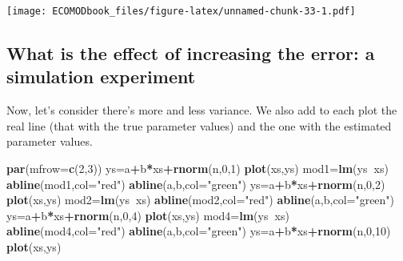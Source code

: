 \documentclass[
]{book}
\newenvironment{Shaded}{\begin{snugshade}}{\end{snugshade}}
\newcommand{\DataTypeTok}[1]{\textcolor[rgb]{0.13,0.29,0.53}{#1}}
\newcommand{\DecValTok}[1]{\textcolor[rgb]{0.00,0.00,0.81}{#1}}
\newcommand{\KeywordTok}[1]{\textcolor[rgb]{0.13,0.29,0.53}{\textbf{#1}}}
\newcommand{\NormalTok}[1]{#1}
\newcommand{\OperatorTok}[1]{\textcolor[rgb]{0.81,0.36,0.00}{\textbf{#1}}}
\newcommand{\StringTok}[1]{\textcolor[rgb]{0.31,0.60,0.02}{#1}}
\begin{document}
\texttt{[image: ECOMODbook\_files/figure-latex/unnamed-chunk-33-1.pdf]}

\hypertarget{what-is-the-effect-of-increasing-the-error-a-simulation-experiment}{%
\subsection{What is the effect of increasing the error: a simulation experiment}\label{what-is-the-effect-of-increasing-the-error-a-simulation-experiment}}

Now, let's consider there's more and less variance. We also add to each plot the real line (that with the true parameter values) and the one with the estimated parameter values.

\begin{Shaded}
\begin{Highlighting}[]
\KeywordTok{par}\NormalTok{(}\DataTypeTok{mfrow=}\KeywordTok{c}\NormalTok{(}\DecValTok{2}\NormalTok{,}\DecValTok{3}\NormalTok{))}
\NormalTok{ys=a}\OperatorTok{+}\NormalTok{b}\OperatorTok{*}\NormalTok{xs}\OperatorTok{+}\KeywordTok{rnorm}\NormalTok{(n,}\DecValTok{0}\NormalTok{,}\DecValTok{1}\NormalTok{)}
\KeywordTok{plot}\NormalTok{(xs,ys)}
\NormalTok{mod1=}\KeywordTok{lm}\NormalTok{(ys}\OperatorTok{~}\NormalTok{xs)}
\KeywordTok{abline}\NormalTok{(mod1,}\DataTypeTok{col=}\StringTok{"red"}\NormalTok{)}
\KeywordTok{abline}\NormalTok{(a,b,}\DataTypeTok{col=}\StringTok{"green"}\NormalTok{)}
\NormalTok{ys=a}\OperatorTok{+}\NormalTok{b}\OperatorTok{*}\NormalTok{xs}\OperatorTok{+}\KeywordTok{rnorm}\NormalTok{(n,}\DecValTok{0}\NormalTok{,}\DecValTok{2}\NormalTok{)}
\KeywordTok{plot}\NormalTok{(xs,ys)}
\NormalTok{mod2=}\KeywordTok{lm}\NormalTok{(ys}\OperatorTok{~}\NormalTok{xs)}
\KeywordTok{abline}\NormalTok{(mod2,}\DataTypeTok{col=}\StringTok{"red"}\NormalTok{)}
\KeywordTok{abline}\NormalTok{(a,b,}\DataTypeTok{col=}\StringTok{"green"}\NormalTok{)}
\NormalTok{ys=a}\OperatorTok{+}\NormalTok{b}\OperatorTok{*}\NormalTok{xs}\OperatorTok{+}\KeywordTok{rnorm}\NormalTok{(n,}\DecValTok{0}\NormalTok{,}\DecValTok{4}\NormalTok{)}
\KeywordTok{plot}\NormalTok{(xs,ys)}
\NormalTok{mod4=}\KeywordTok{lm}\NormalTok{(ys}\OperatorTok{~}\NormalTok{xs)}
\KeywordTok{abline}\NormalTok{(mod4,}\DataTypeTok{col=}\StringTok{"red"}\NormalTok{)}
\KeywordTok{abline}\NormalTok{(a,b,}\DataTypeTok{col=}\StringTok{"green"}\NormalTok{)}
\NormalTok{ys=a}\OperatorTok{+}\NormalTok{b}\OperatorTok{*}\NormalTok{xs}\OperatorTok{+}\KeywordTok{rnorm}\NormalTok{(n,}\DecValTok{0}\NormalTok{,}\DecValTok{10}\NormalTok{)}
\KeywordTok{plot}\NormalTok{(xs,ys)}

\end{Highlighting}
\end{Shaded}
\end{document}
